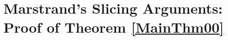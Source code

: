 \documentclass[reqno,12pt]{amsart}
\theoremstyle{definition}
\numberwithin{equation}{section}
\newcommand{\RR}{\mathbb{R}}
\newcommand{\ZZ}{\mathbb{Z}}
\newcommand{\Ad}{\mathrm{Ad}}
\newcommand {\comm}[1]   {\textcolor{red}{#1}}
\begin{document}
	








\section{Marstrand's Slicing Arguments: Proof of Theorem \ref{MainThm00}}\label{S:Proof1}

\end{document}
